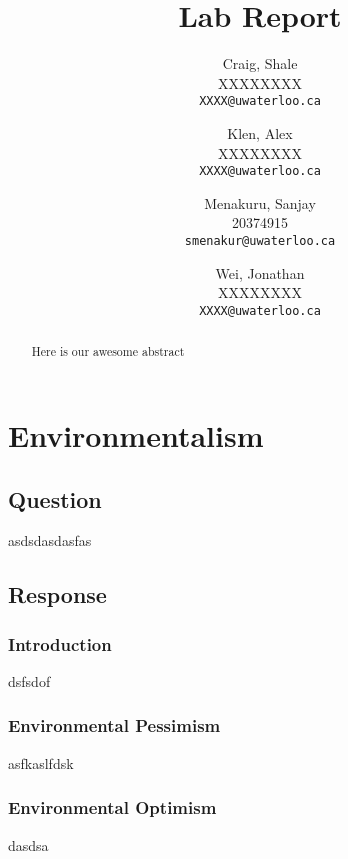 \documentclass[12pt]{report}
\begin{document}

\title{Lab Report}

\author{
    Craig, Shale\\
    XXXXXXXX\\
    \texttt{XXXX@uwaterloo.ca}
    \and
    Klen, Alex\\
    XXXXXXXX\\
    \texttt{XXXX@uwaterloo.ca}
    \and
    Menakuru, Sanjay\\
    20374915\\
    \texttt{smenakur@uwaterloo.ca}
    \and
    Wei, Jonathan\\
    XXXXXXXX\\
    \texttt{XXXX@uwaterloo.ca}
}

\maketitle

\begin{abstract}
    Here is our awesome abstract
\end{abstract}

\tableofcontents


\part{Environmentalism}
\chapter{Question}
    asdsdasdasfas

\chapter{Response}
\section{Introduction}
    dsfsdof

\section{Environmental Pessimism}
    asfkaslfdsk

\section{Environmental Optimism}
    dasdsa
\end{document}

